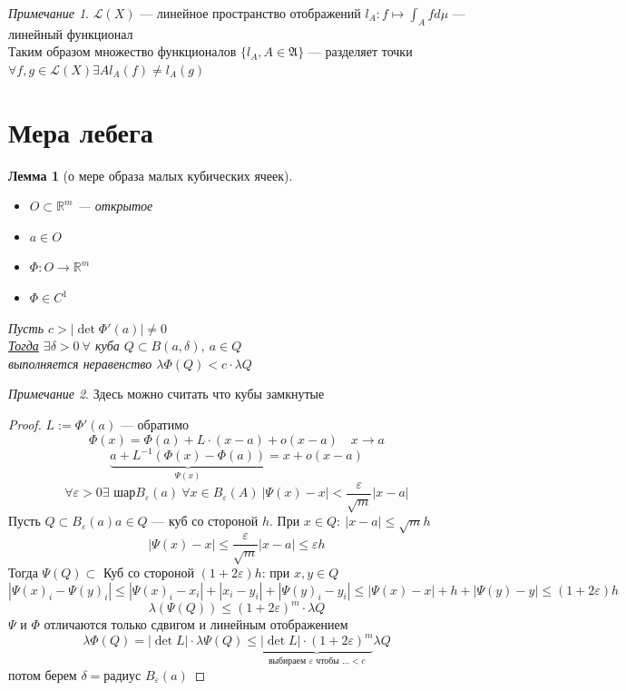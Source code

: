 \documentclass[oneside]{book}
\newcommand{\R}{\mathbb{R}}
\newcommand{\A}{\mathfrak{A}}
\theoremstyle{plain}
\newtheorem{lemma}{Лемма}
\theoremstyle{remark}
\newtheorem*{remark}{Примечание}
\theoremstyle{definition}
\begin{document}
\begin{remark}
\(\mathcal{L}(X)\) --- линейное пространство отображений \(l_A : f \mapsto \int_A f d\mu\) --- линейный функционал \\
Таким образом множество функционалов \(\{l_A, A \in \A\}\) --- разделяет точки \\
\(\forall f, g \in \mathcal{L}(X) \exists A l_A(f) \neq l_A(g)\)
\end{remark}
\section{Мера лебега}
\label{sec:orgb653f2b}
\begin{lemma}[о мере образа малых кубических ячеек]
\-
\begin{itemize}
\item \(O \subset \R^m\) --- открытое
\item \(a \in O\)
\item \(\Phi: O \to \R^m\)
\item \(\Phi \in C^1\)
\end{itemize}
Пусть \(c > |\det\Phi'(a)| \neq 0\) \\
\uline{Тогда} \(\exists \delta > 0\ \forall\) куба \(Q \subset B(a, \delta),\ a\in Q\) \\
выполняется неравенство \(\lambda \Phi(Q) < c \cdot \lambda Q\)
\end{lemma}
\begin{remark}
Здесь можно считать что кубы замкнутые
\end{remark}
\begin{proof}
\(L := \Phi'(a)\) --- обратимо \\
\[ \Phi(x) = \Phi(a) + L\cdot(x - a) + o(x - a)\quad x \to a \]
\[ \underbrace{a + L^{-1}(\Phi(x) - \Phi(a))}_{\Psi(x)} = x + o(x - a) \]
\[ \forall \varepsilon > 0 \exists \text{ шар} B_\varepsilon(a)\ \forall x \in B_\varepsilon(A)\ |\Psi(x) - x| < \frac{\varepsilon}{\sqrt{m}} |x - a| \]
Пусть \(Q \subset B_\varepsilon(a) a \in Q\) --- куб со стороной \(h\). При \(x \in Q:\ |x - a| \le \sqrt{m}h\)
\[ |\Psi(x) - x| \le \frac{\varepsilon}{\sqrt{m}}|x - a| \le \varepsilon h \]
Тогда \(\Psi(Q) \subset\) Куб со стороной \((1 + 2\varepsilon)h\): при \(x, y \in Q\)
\[ |\Psi(x)_i - \Psi(y)_i| \le |\Psi(x)_i - x_i| + |x_i - y_i| + |\Psi(y)_i - y_i| \le |\Psi(x) - x| + h + |\Psi(y) - y| \le (1 + 2\varepsilon)h\]
\[ \lambda(\Psi(Q)) \le (1 + 2\varepsilon)^m \cdot \lambda Q  \]
\(\Psi\) и \(\Phi\) отличаются только сдвигом и линейным отображением
\[ \lambda \Phi(Q) = |\det L| \cdot \lambda \Psi(Q) \le \underbrace{|\det L|\cdot(1 + 2\varepsilon)^m}_{\text{выбираем }\varepsilon\text{ чтобы } ... < c } \lambda Q \]
потом берем \(\delta = \text{радиус } B_\varepsilon(a)\)
\end{proof}
\end{document}
